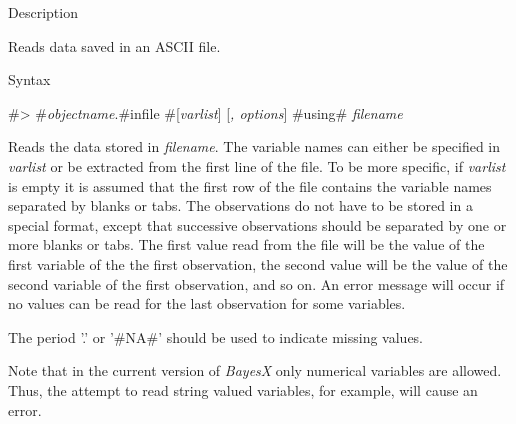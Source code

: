 \begin{stanza}{Description}

Reads data saved in an ASCII file.
\end{stanza}

\begin{stanza}{Syntax}

#> #{\em objectname}.#infile #[{\em varlist}] [{\em , options}]
#using# {\em filename}

Reads the data stored in {\em filename}. The variable names can
either be specified in {\em varlist} or be extracted from the
first line of the file. To be more specific, if {\em varlist} is
empty it is assumed that the first row of the file contains the
variable names separated by blanks or tabs. The observations do
not have to be stored in a special format, except that successive
observations should be separated by one or more blanks or tabs.
The first value read from the file will be the value of the first
variable of the the first observation, the second value will be
the value of the second variable of the first observation, and so
on. An error message will occur if no values can be read for the
last observation for some variables.

The period '.' or '#NA#' should be used to indicate missing
values.

Note that in the current version of {\em BayesX} only numerical
variables are allowed. Thus, the attempt to read string valued
variables, for example, will cause an error.
\end{stanza}


